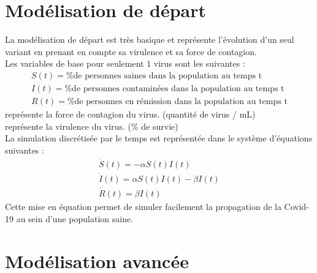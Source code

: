 \documentclass{article}
\begin{document}
\section{Modélisation de départ}

La modélisation de départ est très basique et représente l'évolution d'un seul variant en prenant en compte sa virulence et sa force de contagion.\\
\noindent
Les variables de base pour seulement 1 virus sont les suivantes :
\begin{align}
    S(t)= \text{\% de personnes saines dans la population au temps t} \\
    I(t)= \text{\% de personnes contaminées dans la population au temps t} \\
    R(t)= \text{\% de personnes en rémission dans la population au temps t}
\end{align}
\noindent
\textalpha \space représente la force de contagion du virus. (quantité de virus / mL) \\
\textbeta \space représente la virulence du virus. (\% de survie) \\
\noindent
La simulation discrétisée par le temps est représentée dans le système d'équations suivantes :
\begin{align}
    \dot{S}(t)= -\alpha S(t)I(t) \\
    \dot{I}(t)= \alpha S(t)I(t)-\beta I(t) \\
    \dot{R}(t)= \beta I(t)
\end{align}
\noindent
Cette mise en équation permet de simuler facilement la propagation de la Covid-19 au sein d'une population saine.\\

\section{Modélisation avancée}
\end{document}
